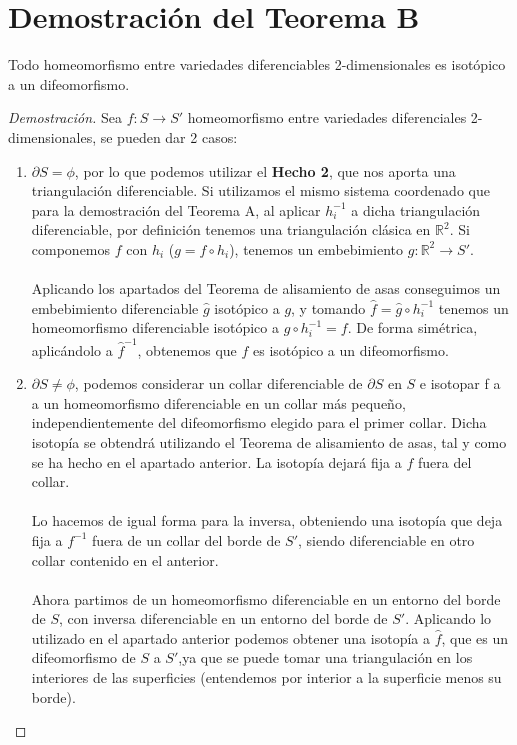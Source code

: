\section{Demostración del Teorema B}
	\begin{teorb}
		Todo homeomorfismo entre variedades diferenciables 2-dimensionales es isotópico a un difeomorfismo.
	\end{teorb}
	\begin{proof}[Demostración]
		Sea $f: S \rightarrow S'$ homeomorfismo entre variedades diferenciales 2-dimensionales, se pueden dar 2 casos:
		\begin{enumerate}
			\item $\partial S = \phi$, por lo que podemos utilizar el \textbf{Hecho 2}, que nos aporta una triangulación diferenciable. Si utilizamos el mismo sistema coordenado que para la demostración del Teorema A, al aplicar $h_i^{-1}$ a dicha triangulación diferenciable, por definición tenemos una triangulación clásica en $\mathbb{R}^2$. Si componemos $f$ con $h_i$ ($g=f\circ h_i$), tenemos un embebimiento $g: \mathbb{R}^2 \rightarrow S'$.\\
			\\ Aplicando los apartados del Teorema de alisamiento de asas conseguimos un embebimiento diferenciable $\widehat{g}$ isotópico a $g$, y tomando $\widehat{f}=\widehat{g}\circ h_i^{-1}$ tenemos un homeomorfismo diferenciable isotópico a $g\circ h_i^{-1}=f$. De forma simétrica, aplicándolo a $\widehat{f}^{-1}$, obtenemos que $f$ es isotópico a un difeomorfismo. 
			\item $\partial S \neq \phi$, podemos considerar un collar diferenciable de $\partial S$ en $S$ e isotopar f a a un homeomorfismo diferenciable en un collar más pequeño, independientemente del difeomorfismo elegido para el primer collar. Dicha isotopía se obtendrá utilizando el Teorema de alisamiento de asas, tal y como se ha hecho en el apartado anterior. La isotopía dejará fija a $f$ fuera del collar.\\
			\\  Lo hacemos de igual forma para la inversa, obteniendo una isotopía que deja fija a $f^{-1}$ fuera de un collar del borde de $S'$, siendo diferenciable en otro collar contenido en el anterior.\\
			\\ Ahora partimos de un homeomorfismo diferenciable en un entorno del borde de $S$, con inversa diferenciable en un entorno del borde de $S'$. Aplicando lo utilizado en el apartado anterior podemos obtener una isotopía a $\widehat{f}$, que es un difeomorfismo de $S$ a $S'$,ya que se puede tomar una triangulación en los interiores de las superficies (entendemos por interior a la superficie menos su borde).
		\end{enumerate}
	\end{proof}
\endinput
